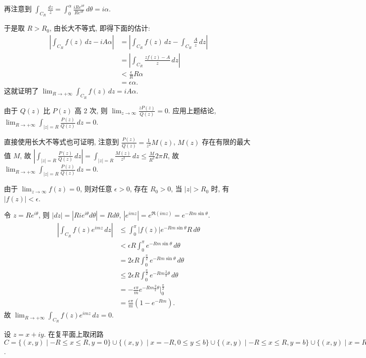 \documentclass{homework}
\begin{document}
再注意到 \(\int_{C_R}\frac{dz}{z}=\int_{0}^{\alpha}\frac{iRe^{i\theta}}{Re^{i\theta}}\,d\theta=i\alpha\).

于是取 \(R>R_0\), 由长大不等式, 即得下面的估计:
\begin{align*}
  \left\lvert\int_{C_R}f(z)\,dz-iA\alpha\right\rvert&=\left\lvert\int_{C_R}f(z)\,dz-\int_{C_R}\frac{A}{z}\,dz\right\rvert\\
  &=\left\lvert\int_{C_R}\frac{zf(z)-A}{z}\,dz\right\rvert\\
  &<\frac{\epsilon}{R}R\alpha\\
  &=\epsilon\alpha.
\end{align*}
这就证明了 \(\lim_{R\to+\infty}\int_{C_R}f(z)\,dz=iA\alpha\).

由于 \(Q(z)\) 比 \(P(z)\) 高 2 次, 则 \(\lim_{z\to\infty}\frac{zP(z)}{Q(z)}=0\).
应用上题结论, \(\lim_{R\to+\infty}\int_{|z|=R}\frac{P(z)}{Q(z)}\,dz=0\).

直接使用长大不等式也可证明, 注意到 \(\frac{P(z)}{Q(z)}=\frac{1}{z^2}M(z)\), \(M(z)\) 存在有限的最大值 \(M\), 故 \(|\int_{|z|=R}\frac{P(z)}{Q(z)}\,dz|=\int_{|z|=R}\frac{M(z)}{z^2}\,dz\leq\frac{M}{R^2}2\pi R\),
故 \(\lim_{R\to+\infty}\int_{|z|=R}\frac{P(z)}{Q(z)}\,dz=0\).

\begin{center}
\end{center}

由于 \(\lim_{z\to\infty}f(z)=0\), 则对任意 \(\epsilon>0\), 存在 \(R_0>0\), 当 \(|z|>R_0\) 时, 有 \(|f(z)|<\epsilon\).

令 \(z=Re^{i\theta}\), 则 \(|dz|=|Rie^{i\theta}d\theta|=Rd\theta\), \(|e^{imz}|=e^{\Re(imz)}=e^{-Rm\sin\theta}\).
\begin{align*}
  \left\lvert\int_{C_R}f(z)e^{imz}\,dz\right\rvert&\leq\int_{0}^{\pi}|f(z)|e^{-Rm\sin\theta}R\,d\theta\\
  &<\epsilon R\int_{0}^{\pi}e^{-Rm\sin\theta}\,d\theta\\
  &=2\epsilon R\int_{0}^{\frac{\pi}{2}}e^{-Rm\sin\theta}\,d\theta\\
  &\leq2\epsilon R\int_{0}^{\frac{\pi}{2}}e^{-Rm\frac{2}{\pi}\theta}\,d\theta\\
  &=-\frac{\epsilon\pi}{m}e^{-Rm\frac{2}{\pi}\theta}|_{0}^{\frac{\pi}{2}}\\
  &=\frac{\epsilon\pi}{m}(1-e^{-Rm}).
\end{align*}
故 \(\lim_{R\to+\infty}\int_{C_R}f(z)e^{imz}\,dz=0\).

设 \(z=x+iy\). 在复平面上取闭路 \(C=\{(x,y)\mid -R\leq x\leq R, y=0\}\cup\{(x,y)\mid x=-R, 0\leq y\leq b\}\cup\{(x,y)\mid -R\leq x\leq R, y=b\}\cup\{(x,y)\mid x=R, 0\leq y\leq b\}\).
\end{document}
